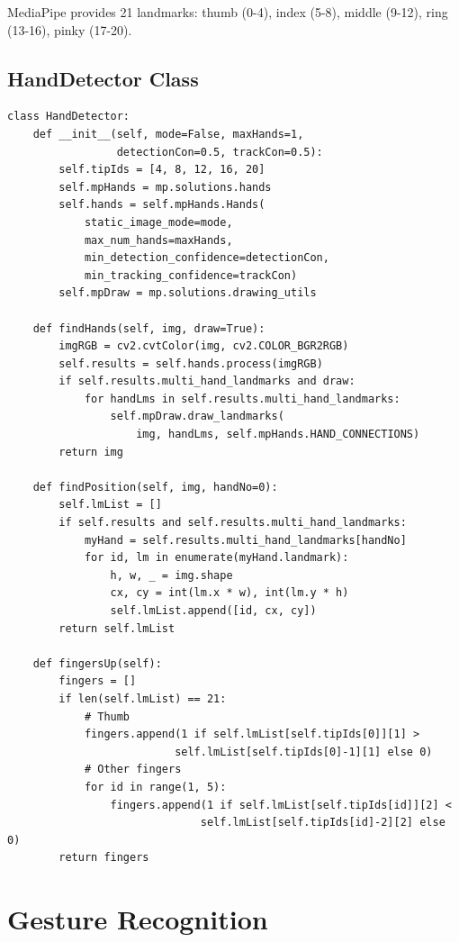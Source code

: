 \documentclass[12pt,a4paper]{report}
\begin{document}
MediaPipe provides 21 landmarks: thumb (0-4), index (5-8), middle (9-12), ring (13-16), pinky (17-20).

\subsection{HandDetector Class}

\begin{lstlisting}[caption={HandDetector Class}, label={code:handdetector}]
class HandDetector:
    def __init__(self, mode=False, maxHands=1, 
                 detectionCon=0.5, trackCon=0.5):
        self.tipIds = [4, 8, 12, 16, 20]
        self.mpHands = mp.solutions.hands
        self.hands = self.mpHands.Hands(
            static_image_mode=mode,
            max_num_hands=maxHands,
            min_detection_confidence=detectionCon,
            min_tracking_confidence=trackCon)
        self.mpDraw = mp.solutions.drawing_utils

    def findHands(self, img, draw=True):
        imgRGB = cv2.cvtColor(img, cv2.COLOR_BGR2RGB)
        self.results = self.hands.process(imgRGB)
        if self.results.multi_hand_landmarks and draw:
            for handLms in self.results.multi_hand_landmarks:
                self.mpDraw.draw_landmarks(
                    img, handLms, self.mpHands.HAND_CONNECTIONS)
        return img

    def findPosition(self, img, handNo=0):
        self.lmList = []
        if self.results and self.results.multi_hand_landmarks:
            myHand = self.results.multi_hand_landmarks[handNo]
            for id, lm in enumerate(myHand.landmark):
                h, w, _ = img.shape
                cx, cy = int(lm.x * w), int(lm.y * h)
                self.lmList.append([id, cx, cy])
        return self.lmList

    def fingersUp(self):
        fingers = []
        if len(self.lmList) == 21:
            # Thumb
            fingers.append(1 if self.lmList[self.tipIds[0]][1] > 
                          self.lmList[self.tipIds[0]-1][1] else 0)
            # Other fingers
            for id in range(1, 5):
                fingers.append(1 if self.lmList[self.tipIds[id]][2] < 
                              self.lmList[self.tipIds[id]-2][2] else 0)
        return fingers
\end{lstlisting}

\section{Gesture Recognition}
\end{document}
